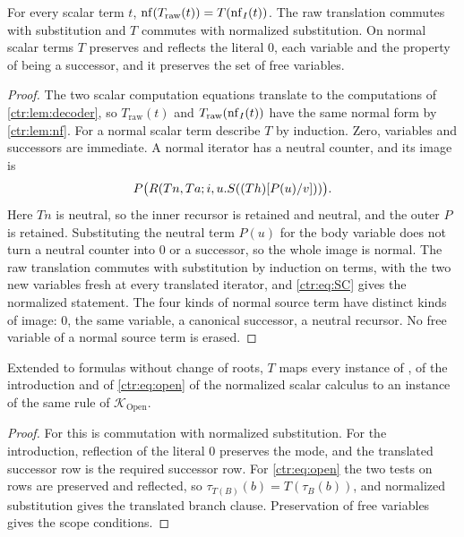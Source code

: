 \begin{lemma}\label{ctr:lem:embedding}
For every scalar term $t$, $\operatorname{nf}(T_{\mathrm{raw}}(t))=T(\operatorname{nf}_I(t))$. The raw translation
commutes with substitution and $T$ commutes with normalized substitution. On normal scalar
terms $T$ preserves and reflects the literal $0$, each variable and the property of being a
successor, and it preserves the set of free variables.
\end{lemma}
\begin{proof}
The two scalar computation equations translate to the computations of
\cref{ctr:lem:decoder}, so $T_{\mathrm{raw}}(t)$ and $T_{\mathrm{raw}}(\operatorname{nf}_I(t))$ have the
same normal form by \cref{ctr:lem:nf}. For a normal scalar term describe $T$ by induction.
Zero, variables and successors are immediate. A normal iterator has a neutral counter, and
its image is
\[
 P\bigl(R(Tn,Ta;i,u.S((Th)[P(u)/v]))\bigr).
\]
Here $Tn$ is neutral, so the inner recursor is retained and neutral, and the outer $P$ is
retained. Substituting the neutral term $P(u)$ for the body variable does not turn a neutral
counter into $0$ or a successor, so the whole image is normal. The raw translation commutes
with substitution by induction on terms, with the two new variables fresh at every
translated iterator, and \eqref{ctr:eq:SC} gives the normalized statement. The four kinds of
normal source term have distinct kinds of image: $0$, the same variable, a canonical
successor, a neutral recursor. No free variable of a normal source term is erased.
\end{proof}

\begin{proposition}\label{ctr:prop:scalartrans}
Extended to formulas without change of roots, $T$ maps every instance of , of
the introduction and of \eqref{ctr:eq:open} of the normalized scalar calculus to an instance
of the same rule of $\mathcal K_{\mathrm{Open}}$.
\end{proposition}
\begin{proof}
For  this is commutation with normalized substitution. For the introduction,
reflection of the literal $0$ preserves the mode, and the translated successor row is the
required successor row. For \eqref{ctr:eq:open} the two tests on rows are preserved and
reflected, so $\tau_{T(B)}(b)=T(\tau_B(b))$, and normalized substitution gives the translated
branch clause. Preservation of free variables gives the scope conditions.
\end{proof}

